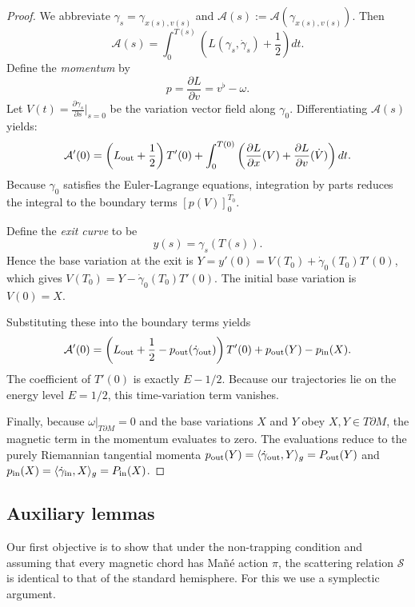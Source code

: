 \documentclass[12pt]{amsart}
\numberwithin{equation}{section}
\begin{document}
\begin{proof} We abbreviate $\gamma_{s}=\gamma_{x(s),v(s)}$ and ${\mathcal A}(s):={\mathcal A}(\gamma_{x(s),v(s)})$. Then
\begin{equation}
{\mathcal A}(s) =\int_0^{T(s)} \left( L(\gamma_s, \dot{\gamma}_s) + \frac{1}{2} \right) dt.
\end{equation}
Define the \emph{momentum} by
\begin{equation}
p = \frac{\partial L}{\partial v} = v^\flat - \omega .
\end{equation}
Let $V(t) = \frac{\partial \gamma_s}{\partial s}|_{s=0}$ be the variation vector field along $\gamma_0$. Differentiating ${\mathcal A}(s)$ yields:
\begin{equation}
    {\mathcal A}'(0) = \left( L_{\rm out} + \frac{1}{2} \right) T'(0) + \int_0^{T(0)} \left( \frac{\partial L}{\partial x}(V) + \frac{\partial L}{\partial v} (\dot{V}) \right) dt .
\end{equation}
Because $\gamma_0$ satisfies the Euler-Lagrange equations, integration by parts reduces the integral to the boundary terms $[p (V)]_0^{T_0}$.

Define the \emph{exit curve} to be
\begin{equation}
y(s) = \gamma_s(T(s)).
\end{equation}
Hence the base variation at the exit is $Y = y'(0) = V(T_0) + \dot{\gamma}_0(T_0) T'(0)$, which gives $V(T_0) = Y - \dot{\gamma}_0(T_0) T'(0)$. The initial base variation is $V(0) = X$.

Substituting these into the boundary terms yields
\begin{equation}
    {\mathcal A}'(0) = \left(  L_{\rm out} + \frac{1}{2} -p_{\rm out}(\dot{\gamma}_{\rm out}) \right) T'(0) +p_{\rm out}(Y) - p_{\rm in}(X) .
\end{equation}
The coefficient of $T'(0)$ is exactly $E - 1/2$. Because our trajectories lie on the energy level $E = 1/2$, this time-variation term vanishes.

Finally, because $\omega|_{T\partial M} = 0$ and the base variations $X$ and $Y$ obey $X, Y \in T\partial M$, the magnetic term in the momentum evaluates to zero. The evaluations reduce to the purely Riemannian tangential momenta $p_{\rm out}(Y) = \langle \dot{\gamma}_{\rm out}, Y \rangle_g = P_{\rm out}(Y)$ and $p_{\rm in}(X) = \langle \dot{\gamma}_{\rm in}, X \rangle_g = P_{\rm in}(X)$.
\end{proof}

\subsection{Auxiliary lemmas}\label{section4.5}
Our first objective is to show that under the non-trapping condition and assuming that every magnetic chord has Ma\~n\'e action $\pi$, the scattering relation ${\mathcal S}$ is identical to that of the standard hemisphere. For this we use a symplectic argument.
\end{document}
